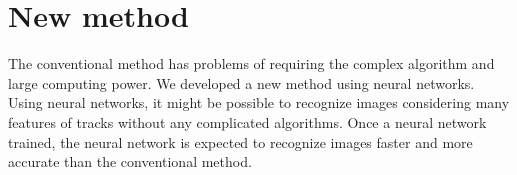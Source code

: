 \documentclass{jps-cp}
\begin{document}
\section{New method}
The conventional method has problems of requiring the complex algorithm and large computing power.
We developed a new method using neural networks.
Using neural networks, it might be possible to recognize images
considering many features of tracks without any complicated algorithms.
Once a neural network trained, the neural network is expected to recognize images faster and more accurate than the conventional method.

\end{document}
